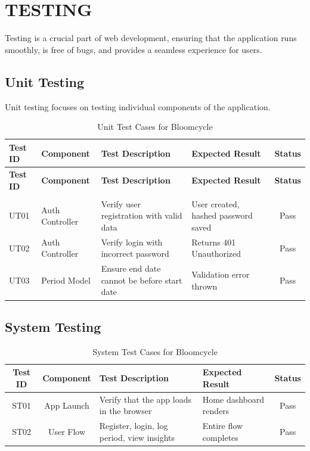 \chapter{TESTING}
Testing is a crucial part of web development, ensuring that the application runs smoothly, is free of bugs, and provides a seamless experience for users. 

\section{Unit Testing}
Unit testing focuses on testing individual components of the application.

\begin{longtable}{|p{1.5cm}|p{2.5cm}|p{4cm}|p{4cm}|c|}
    \hline
    \textbf{Test ID} & \textbf{Component} & \textbf{Test Description} & \textbf{Expected Result} & \textbf{Status} \\
    \hline
    \endfirsthead
    \hline
    \textbf{Test ID} & \textbf{Component} & \textbf{Test Description} & \textbf{Expected Result} & \textbf{Status} \\
    \hline
    \endhead
    \caption{Unit Test Cases for Bloomcycle} \label{tab:unit_tests} \\
    \endlastfoot

    UT01 & Auth Controller & Verify user registration with valid data & User created, hashed password saved & Pass \\
    \hline
    UT02 & Auth Controller & Verify login with incorrect password & Returns 401 Unauthorized & Pass \\
    \hline
    UT03 & Period Model & Ensure end date cannot be before start date & Validation error thrown & Pass \\
    \hline
\end{longtable}

\section{System Testing}
\begin{table}[H]
    \centering
    \renewcommand{\arraystretch}{1.3}
    \begin{tabular}{|c|c|p{4cm}|p{3cm}|c|}
        \hline
        \textbf{Test ID} & \textbf{Component} & \textbf{Test Description} & \textbf{Expected Result} & \textbf{Status} \\
        \hline
        ST01 & App Launch & Verify that the app loads in the browser & Home dashboard renders & Pass \\
        \hline
        ST02 & User Flow & Register, login, log period, view insights & Entire flow completes & Pass \\
        \hline
    \end{tabular}
    \caption{System Test Cases for Bloomcycle}
\end{table}
